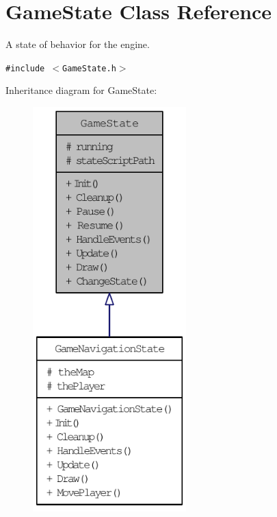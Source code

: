 \hypertarget{class_game_state}{
\section{GameState Class Reference}
\label{dd/d87/class_game_state}
}
A state of behavior for the engine.  


{\tt \#include $<$GameState.h$>$}

Inheritance diagram for GameState:\nopagebreak
\begin{figure}[H]
\begin{center}
\leavevmode
\includegraphics[width=168pt]{d8/d0b/class_game_state__inherit__graph}
\end{center}
\end{figure}
